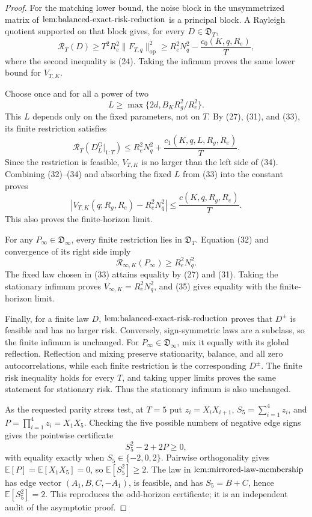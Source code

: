 \documentclass{article}
\begin{document}
\begin{proof}
For the matching lower bound, the noise block in the unsymmetrized matrix of \(\textnormal{lem:balanced-exact-risk-reduction}\) is a principal block.  A Rayleigh quotient supported on that block gives, for every \(D\in\mathfrak D_T\),
\[
\mathcal R_T(D)\ge T^2R_e^2\|F_{T,q}\|_{\mathrm{op}}^2
\ge R_e^2N_q^2-\frac{c_0(K,q,R_e)}{T}, \tag{32}
\]
where the second inequality is (24).  Taking the infimum proves the same lower bound for \(V_{T,K}\).

Choose once and for all a power of two
\[
L\ge\max\{2d,B_KR_g^2/R_e^2\}. \tag{33}
\]
This \(L\) depends only on the fixed parameters, not on \(T\).  By (27), (31), and (33), its finite restriction satisfies
\[
\mathcal R_T(D_L^{\mathrm G}|_{1:T})
\le R_e^2N_q^2+\frac{c_1(K,q,L,R_g,R_e)}{T}. \tag{34}
\]
Since the restriction is feasible, \(V_{T,K}\) is no larger than the left side of (34).  Combining (32)--(34) and absorbing the fixed \(L\) from (33) into the constant proves
\[
\left|V_{T,K}(q;R_g,R_e)-R_e^2N_q^2\right|
\le \frac{c(K,q,R_g,R_e)}{T}. \tag{35}
\]
This also proves the finite-horizon limit.

For any \(P_\infty\in\mathfrak D_\infty\), every finite restriction lies in \(\mathfrak D_T\).  Equation (32) and convergence of its right side imply
\[
\mathcal R_{\infty,K}(P_\infty)\ge R_e^2N_q^2. \tag{36}
\]
The fixed law chosen in (33) attains equality by (27) and (31).  Taking the stationary infimum proves \(V_{\infty,K}=R_e^2N_q^2\), and (35) gives equality with the finite-horizon limit.

Finally, for a finite law \(D\), \(\textnormal{lem:balanced-exact-risk-reduction}\) proves that \(D^{\pm}\) is feasible and has no larger risk.  Conversely, sign-symmetric laws are a subclass, so the finite infimum is unchanged.  For \(P_\infty\in\mathfrak D_\infty\), mix it equally with its global reflection.  Reflection and mixing preserve stationarity, balance, and all zero autocorrelations, while each finite restriction is the corresponding \(D^{\pm}\).  The finite risk inequality holds for every \(T\), and taking upper limits proves the same statement for stationary risk.  Thus the stationary infimum is also unchanged.

As the requested parity stress test, at \(T=5\) put \(z_i=X_iX_{i+1}\), \(S_5=\sum_{i=1}^4z_i\), and \(P=\prod_{i=1}^4z_i=X_1X_5\).  Checking the five possible numbers of negative edge signs gives the pointwise certificate
\[
S_5^2-2+2P\ge0, \tag{37}
\]
with equality exactly when \(S_5\in\{-2,0,2\}\).  Pairwise orthogonality gives \(\mathbb E[P]=\mathbb E[X_1X_5]=0\), so \(\mathbb E[S_5^2]\ge2\).  The law in \(\textnormal{lem:mirrored-law-membership}\) has edge vector \((A_1,B,C,-A_1)\), is feasible, and has \(S_5=B+C\), hence \(\mathbb E[S_5^2]=2\).  This reproduces the odd-horizon certificate; it is an independent audit of the asymptotic proof.
\end{proof}
\end{document}
